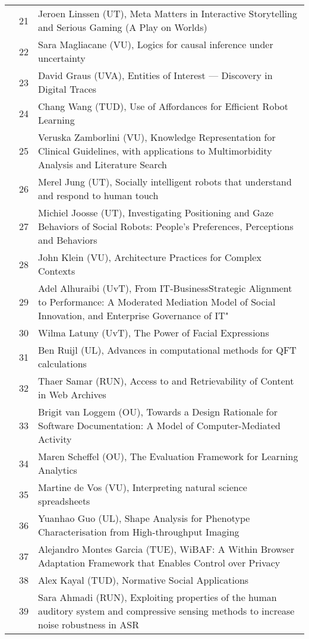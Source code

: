 \begin{longtabu}{@{}l@{ }l@{\hspace{1em}}X}
	&	 21	&	 Jeroen Linssen (UT), Meta Matters in Interactive Storytelling and Serious Gaming (A Play on Worlds)\\
	&	 22	&	 Sara Magliacane (VU), Logics for causal inference under uncertainty\\
	&	 23	&	 David Graus (UVA), Entities of Interest --- Discovery in Digital Traces\\
	&	 24	&	 Chang Wang (TUD), Use of Affordances for Efficient Robot Learning\\
	&	 25	&	 Veruska Zamborlini (VU), Knowledge Representation for Clinical Guidelines, with applications to Multimorbidity Analysis and Literature Search\\
	&	 26	&	 Merel Jung (UT), Socially intelligent robots that understand and respond to human touch\\
	&	 27	&	 Michiel Joosse (UT), Investigating Positioning and Gaze Behaviors of Social Robots: People's Preferences, Perceptions and Behaviors\\
	&	 28	&	 John Klein (VU), Architecture Practices for Complex Contexts\\
	&	 29	&	 Adel Alhuraibi (UvT), From IT-BusinessStrategic Alignment to Performance: A Moderated Mediation Model of Social Innovation, and Enterprise Governance of    IT"\\
	&	 30	&	 Wilma Latuny (UvT), The Power of Facial Expressions\\
	&	 31	&	 Ben Ruijl (UL), Advances in computational methods for QFT calculations\\
	&	 32	& 	 Thaer Samar (RUN), Access to and Retrievability of Content in Web Archives\\
	&	 33	&	 Brigit van Loggem (OU), Towards a Design Rationale for Software Documentation: A Model of Computer-Mediated Activity\\
	&	 34	&	 Maren Scheffel (OU), The Evaluation Framework for Learning Analytics \\
	&	 35	&	 Martine de Vos (VU), Interpreting natural science spreadsheets \\
	&	 36	&	 Yuanhao Guo (UL), Shape Analysis for Phenotype Characterisation from High-throughput Imaging \\
	&	 37	&	 Alejandro Montes Garcia (TUE), WiBAF: A Within Browser Adaptation Framework that Enables Control over Privacy \\
	&	 38	&	 Alex Kayal (TUD), Normative Social Applications \\
	&	 39	&	 Sara Ahmadi (RUN), Exploiting properties of the human auditory system and compressive sensing methods to increase   noise robustness in ASR \\

\end{longtabu}
